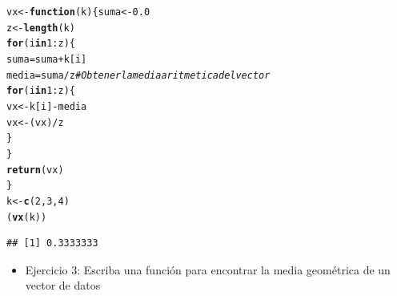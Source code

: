 \documentclass[12pt,letterpaper]{article}\usepackage[]{graphicx}\usepackage[]{color}
\makeatletter
\newcommand{\hlnum}[1]{\textcolor[rgb]{0.686,0.059,0.569}{#1}}%
\newcommand{\hlcom}[1]{\textcolor[rgb]{0.678,0.584,0.686}{\textit{#1}}}%
\newcommand{\hlopt}[1]{\textcolor[rgb]{0,0,0}{#1}}%
\newcommand{\hlstd}[1]{\textcolor[rgb]{0.345,0.345,0.345}{#1}}%
\newcommand{\hlkwa}[1]{\textcolor[rgb]{0.161,0.373,0.58}{\textbf{#1}}}%
\newcommand{\hlkwb}[1]{\textcolor[rgb]{0.69,0.353,0.396}{#1}}%
\newcommand{\hlkwc}[1]{\textcolor[rgb]{0.333,0.667,0.333}{#1}}%
\newcommand{\hlkwd}[1]{\textcolor[rgb]{0.737,0.353,0.396}{\textbf{#1}}}%
\newenvironment{kframe}{%
 \def\at@end@of@kframe{}%
 \ifinner\ifhmode%
  \def\at@end@of@kframe{\end{minipage}}%
  \begin{minipage}{\columnwidth}%
 \fi\fi%
 \def\FrameCommand##1{\hskip\@totalleftmargin \hskip-\fboxsep
 \colorbox{shadecolor}{##1}\hskip-\fboxsep
     \hskip-\linewidth \hskip-\@totalleftmargin \hskip\columnwidth}%
 \MakeFramed {\advance\hsize-\width
   \@totalleftmargin\z@ \linewidth\hsize
   \@setminipage}}%
 {\par\unskip\endMakeFramed%
 \at@end@of@kframe}
\newenvironment{knitrout}{}{} %
\makeatother
\begin{document}
\begin{knitrout}
\color{fgcolor}\begin{kframe}
\begin{alltt}
\hlstd{vx}\hlkwb{<-}\hlkwa{function}\hlstd{(}\hlkwc{k}\hlstd{) \{ suma} \hlkwb{<-} \hlnum{0.0}
  \hlstd{z}\hlkwb{<-}\hlkwd{length}\hlstd{(k)}
  \hlkwa{for}\hlstd{(i} \hlkwa{in} \hlnum{1}\hlopt{:}\hlstd{z)\{}
    \hlstd{suma} \hlkwb{=} \hlstd{suma} \hlopt{+} \hlstd{k[i]}
    \hlstd{media} \hlkwb{=} \hlstd{suma}\hlopt{/}\hlstd{z} \hlcom{# Obtener la media aritmetica del vector}
    \hlkwa{for}\hlstd{(i} \hlkwa{in} \hlnum{1}\hlopt{:}\hlstd{z)\{}
      \hlstd{vx}\hlkwb{<-}\hlstd{k[i]}\hlopt{-}\hlstd{media}
      \hlstd{vx}\hlkwb{<-}\hlstd{(vx)}\hlopt{/}\hlstd{z}
    \hlstd{\}}
  \hlstd{\}}
  \hlkwd{return}\hlstd{(vx)}
\hlstd{\}}
\hlstd{k} \hlkwb{<-} \hlkwd{c}\hlstd{(}\hlnum{2}\hlstd{,}\hlnum{3}\hlstd{,}\hlnum{4}\hlstd{)}
\hlstd{(}\hlkwd{vx}\hlstd{(k))}
\end{alltt}
\begin{verbatim}
## [1] 0.3333333
\end{verbatim}
\end{kframe}
\end{knitrout}
\begin{itemize}
\item Ejercicio 3: Escriba una funci\'on para encontrar la media geom\'etrica de un vector de datos
\end{itemize}
\end{document}
